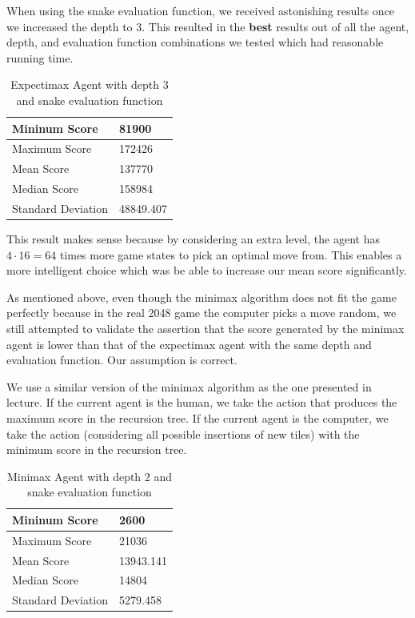 \documentclass[9pt,twocolumn]{article}
\begin{document}
When using the snake evaluation function, we received astonishing results once we increased the depth to 3. This resulted in the \textbf{best} results out of all the agent, depth, and evaluation function combinations we tested which had reasonable running time.

\begin{table}[!htbp]

\centering

\begin{tabular}{|l|l|}
\hline
Mininum Score      & 81900 \\ \hline
Maximum Score      & 172426 \\ \hline
Mean Score         & 137770 \\ \hline
Median Score       & 158984 \\ \hline
Standard Deviation & 48849.407 \\ \hline
\end{tabular}

\caption{Expectimax Agent with depth 3 and snake evaluation function}

\end{table}

This result makes sense because by considering an extra level, the agent has $4 \cdot 16 = 64$ times more game states to pick an optimal move from. This enables a more intelligent choice which was be able to increase our mean score significantly.

As mentioned above, even though the minimax algorithm does not fit the game perfectly because in the real 2048 game the computer picks a move random, we still attempted to validate the assertion that the score generated by the minimax agent is lower than that of the expectimax agent with the same depth and evaluation function. Our assumption is correct.

We use a similar version of the minimax algorithm as the one presented in lecture. If the current agent is the human, we take the action that produces the maximum score in the recursion tree. If the current agent is the computer, we take the action (considering all possible insertions of new tiles) with the minimum score in the recursion tree.

\begin{table}[!htbp]

\centering

\begin{tabular}{|l|l|}
\hline
Mininum Score      & 2600 \\ \hline
Maximum Score      & 21036 \\ \hline
Mean Score         & 13943.141 \\ \hline
Median Score       & 14804 \\ \hline
Standard Deviation & 5279.458 \\ \hline
\end{tabular}

\caption{Minimax Agent with depth 2 and snake evaluation function}

\end{table}
\end{document}
